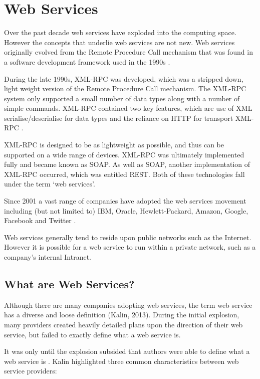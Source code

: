 \section{Web Services}

Over the past decade web services have exploded into the computing space. 
However the concepts that underlie web services are not new. Web services 
originally evolved from the Remote Procedure Call mechanism that was found in a
software development framework used in the 1990s \citep{kalin13}.

During the late 1990s, XML-RPC was developed, which was a stripped down, light 
weight version of the Remote Procedure Call mechanism. The XML-RPC system only 
supported a small number of data types along with a number of simple commands. 
XML-RPC contained two key features, which are use of XML serialise/deserialise 
for data types and the reliance on HTTP for transport XML-RPC \citep{kalin13}.

XML-RPC is designed to be as lightweight as possible, and thus can be supported
on a wide range of devices. XML-RPC was ultimately implemented fully and became
known as SOAP. As well as SOAP, another implementation of XML-RPC occurred, 
which was entitled REST. Both of these technologies fall under the term `web 
services'.

Since 2001 a vast range of companies have adopted the web services movement 
including (but not limited to) IBM, Oracle, Hewlett-Packard, Amazon, Google, 
Facebook and Twitter \citep{sullivan01, kalin13}.

Web services generally tend to reside upon public networks such as the 
Internet. However it is possible for a web service to run within a private 
network, such as a company's internal Intranet. 


\newpage
\subsection{What are Web Services?}

Although there are many companies adopting web services, the term web service 
has a diverse and loose definition (Kalin, 2013). During the initial explosion, 
many providers created heavily detailed plans upon the direction of their web 
service, but failed to exactly define what a web service is.

It was only until the explosion subsided that authors were able to define what 
a web service is \citep{kalin13}. \citet{kalin13} Kalin highlighted three 
common characteristics between web service providers:

